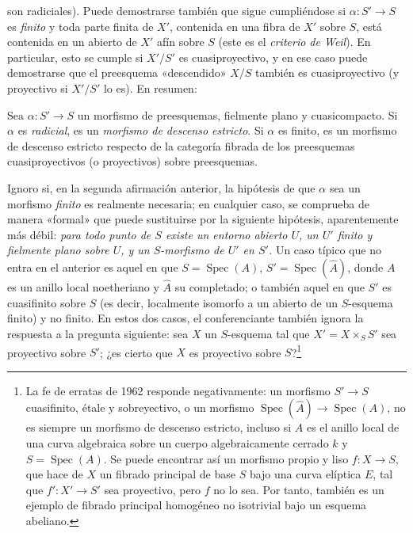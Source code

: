 son radiciales). Puede demostrarse también que sigue cumpliéndose si
$\alpha:S'\longrightarrow S$ es \emph{finito} y toda parte finita de $X'$,
contenida en una fibra de $X'$ sobre $S$, está contenida en un abierto de $X'$
afín sobre $S$ (este es el \emph{criterio de Weil}). En particular, esto se
cumple si $X'/S'$ es cuasiproyectivo, y en ese caso puede demostrarse que el
preesquema «descendido» $X/S$ también es cuasiproyectivo (y proyectivo si
$X'/S'$ lo es). En resumen:

 Sea $\alpha:S'\longrightarrow S$ un morfismo de
preesquemas, fielmente plano y cuasicompacto. Si $\alpha$ es \emph{radicial},
es un \emph{morfismo de descenso estricto}. Si $\alpha$ es finito, es un
morfismo de descenso estricto respecto de la categoría fibrada de los
preesquemas cuasiproyectivos (o proyectivos) sobre preesquemas.

 Ignoro si, en la segunda afirmación anterior, la
hipótesis de que $\alpha$ sea un morfismo \emph{finito} es realmente necesaria;
en cualquier caso, se comprueba de manera «formal» que puede sustituirse por la
siguiente hipótesis, aparentemente más débil: \emph{para todo punto de $S$
existe un entorno abierto $U$, un $U'$ finito y fielmente plano sobre $U$, y un
$S$-morfismo de $U'$ en $S'$.} Un caso típico que no entra en el anterior es
aquel en que $S=\operatorname{Spec}(A)$,
$S'=\operatorname{Spec}(\widehat A)$, donde $A$ es un anillo local noetheriano
y $\widehat A$ su completado; o también aquel en que $S'$ es cuasifinito sobre
$S$ (es decir, localmente isomorfo a un abierto de un $S$-esquema finito) y no
finito. En estos dos casos, el conferenciante también ignora la respuesta a la
pregunta siguiente: sea $X$ un $S$-esquema tal que $X'=X\times_SS'$ sea
proyectivo sobre $S'$; ¿es cierto que $X$ es proyectivo sobre
$S$?\footnote{La fe de erratas de 1962 responde negativamente: un morfismo
$S'\longrightarrow S$ cuasifinito, étale y sobreyectivo, o un morfismo
$\operatorname{Spec}(\widehat A)\longrightarrow\operatorname{Spec}(A)$, no es
siempre un morfismo de descenso estricto, incluso si $A$ es el anillo local de
una curva algebraica sobre un cuerpo algebraicamente cerrado $k$ y
$S=\operatorname{Spec}(A)$. Se puede encontrar así un morfismo propio y liso
$f:X\longrightarrow S$, que hace de $X$ un fibrado principal de base $S$ bajo
una curva elíptica $E$, tal que $f':X'\longrightarrow S'$ sea proyectivo, pero
$f$ no lo sea. Por tanto, también es un ejemplo de fibrado principal homogéneo
no isotrivial bajo un esquema abeliano.}

